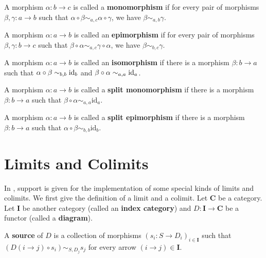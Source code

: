\begin{definition}
A morphism $\alpha: b \rightarrow c$ is called a \textbf{monomorphism} if for every pair of morphisms 
$\beta, \gamma: a \rightarrow b$ such that $\alpha \circ \beta \sim_{a,c} \alpha \circ \gamma$,
we have $\beta \sim_{a,b} \gamma$.
\end{definition}


\begin{definition}
 A morphism $\alpha: a \rightarrow b$ is called an \textbf{epimorphism} if for every pair of morphisms
 $\beta, \gamma: b \rightarrow c$ such that $\beta \circ \alpha \sim_{a,c} \gamma \circ \alpha$,
 we have $\beta \sim_{b,c} \gamma$.
\end{definition}

\begin{definition}
 A morphism $\alpha: a \rightarrow b$ is called an \textbf{isomorphism} if there is a morphism $\beta: b \rightarrow a$
 such that $\alpha \circ \beta \sim_{b,b} \mathrm{id}_{b}$ and $\beta \circ \alpha \sim_{a,a} \mathrm{id}_{a}$.
\end{definition}

\begin{definition}
 A morphism $\alpha: a \rightarrow b$ is called a \textbf{split monomorphism} if there is a morphism $\beta: b \rightarrow a$
 such that $\beta \circ \alpha \sim_{a,a} \mathrm{id}_{a}$.
\end{definition}

\begin{definition}
 A morphism $\alpha: a \rightarrow b$ is called a \textbf{split epimorphism} if there is a morphism $\beta: b \rightarrow a$
 such that $\alpha \circ \beta \sim_{b,b} \mathrm{id}_{b}$.
\end{definition}



\section{Limits and Colimits}\label{section:universalobjects}

In \CapPkg, support is given for the implementation of some special kinds of limits and
colimits. We first give the definition of a limit and a colimit.
Let $\mathbf{C}$ be a category. Let $\mathbf{I}$ be another category (called an \textbf{index category}) and $D: \mathbf{I} \rightarrow \mathbf{C}$
be a functor (called a \textbf{diagram}). 
\begin{definition} 
 A \textbf{source} of $D$ is a collection of morphisms $( s_i: S \rightarrow D_i)_{i \in \mathbf{I}}$ such that
 $\left( D( i \rightarrow j ) \circ s_i \right) \sim_{S,D_j} s_j$ for every arrow $(i \rightarrow j) \in \mathbf{I}$.
\end{definition}
 
